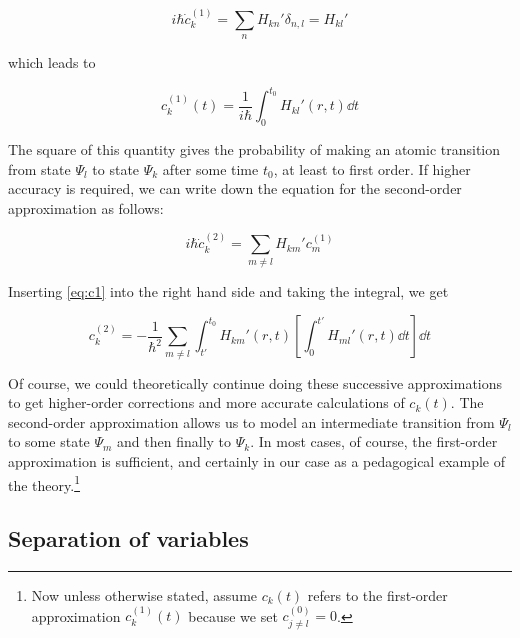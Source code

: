 \begin{equation}
	i\hbar \dot{c}_k^{(1)} = \sum_n H_{kn}' \delta_{n,l} = H_{kl}'
\end{equation}

\noindent which leads to

\begin{tcolorbox}[title = First order perturbation coefficient] \vspace{-2ex}
	\begin{equation}
		c_k^{(1)}(t) = \frac{1}{i\hbar} \int_{0}^{t_0} H_{kl}'(r,t) \dd{t} \label{eq:c1}
	\end{equation}
\end{tcolorbox}

The square of this quantity gives the probability of making an atomic transition from state $\Psi_l$ to state $\Psi_k$ after some time $t_0$, at least to first order. 
If higher accuracy is required, we can write down the equation for the second-order approximation as follows:

\begin{equation*}
	i\hbar \dot{c}_k^{(2)} = \sum_{m\neq l} H_{km}'c_m^{(1)}
\end{equation*}

Inserting \autoref{eq:c1} into the right hand side and taking the integral, we get

\begin{equation}
	c_k^{(2)} = -\frac{1}{\hbar^2} \sum_{m\neq l} \int_{t'}^{t_0} H_{km}'(r,t) \left[ \int_{0}^{t'} H_{ml}'(r,t) \dd{t} \right] \dd{t}
\end{equation}

Of course, we could theoretically continue doing these successive approximations to get higher-order corrections and more accurate calculations of $c_k(t)$. 
The second-order approximation allows us to model an intermediate transition from $\Psi_l$ to some state $\Psi_m$ and then finally to $\Psi_k$. 
In most cases, of course, the first-order approximation is sufficient, and certainly in our case as a pedagogical example of the theory.\footnote{Now unless otherwise stated, assume $c_k(t)$ refers to the first-order approximation $c_k^{(1)}(t)$ because we set $c^{(0)}_{j \neq l} = 0$.}


\subsection{Separation of variables}

